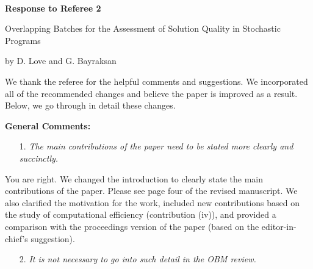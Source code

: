 \documentclass[11pt,notitlepage,onecolumn]{article}
\newcommand{\noi}{\noindent}
\begin{document}

\singlespacing

\baselineskip0.26in


\pagebreak

\
\begin{center}
\textbf{\Large Response to Referee 2} 
\medskip

{\large Overlapping Batches for the Assessment of Solution Quality in Stochastic Programs}
\medskip

{\footnotesize by D. Love and G. Bayraksan}
\end{center}

\bigskip


\noi 
We thank the referee for the helpful comments and suggestions. 
We incorporated all of the recommended changes and believe the paper is improved as a result. 
Below, we go through in detail these changes. 
\medskip

\bigskip 


\noi  
{\large \bf General Comments:}
\medskip 


\begin{itemize}
\item[1.] \textit{The main contributions of the paper need to be stated more clearly and succinctly.}
\end{itemize}

\noindent 
You are right. 
We changed the introduction to clearly state the main contributions of the paper.  
Please see page four of the revised manuscript. 
We also clarified the motivation for the work, included new contributions based on the study of computational efficiency (contribution (iv)), and provided a comparison with the proceedings version of the paper (based on the editor-in-chief's suggestion).
\medskip 

\begin{itemize}
\item[2.] \textit{It is not necessary to go into such detail in the OBM review.}
\end{itemize}
\end{document}

